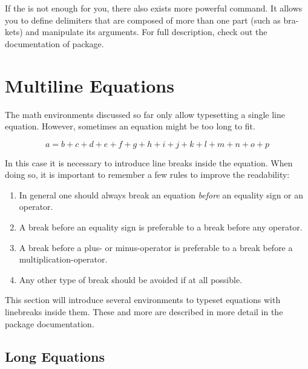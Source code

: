 If the  is not enough for you, there also exists
more powerful  command. It allows you to define
delimiters that are composed of more than one part (such as bra-kets) and
manipulate its arguments. For full description, check out the documentation
of  package.

\section{Multiline Equations}

The math environments discussed so far only allow typesetting a single line
equation. However, sometimes an equation might be too long to fit.
\begin{example}
\begin{equation}
  a = b + c + d + e + f 
  + g + h + i + j 
  + k + l + m + n + o + p  
\end{equation}
\end{example}
In this case it is necessary to introduce line breaks inside the equation. When
doing so, it is important to remember a few rules to improve the readability:
\begin{enumerate}
  \item In general one should always break an equation \emph{before} an
        equality sign or an operator.
  \item A break before an equality sign is preferable to a break before
        any operator.
  \item A break before a plus- or minus-operator is preferable to a break
        before a multiplication-operator.
  \item Any other type of break should be avoided if at all possible.
\end{enumerate}

This section will introduce several environments to typeset equations with
linebreaks inside them. These and more are described in more detail in the
 package documentation.

\subsection{Long Equations}\label{sec:multline}

